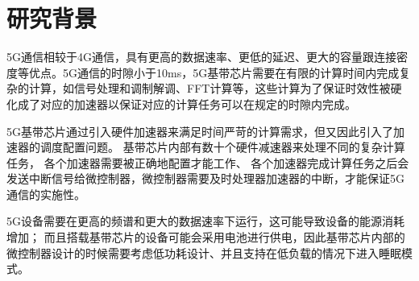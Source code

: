 \documentclass[a4paper, 12pt]{article}
\newif\ifchinese %
\begin{document}

\tableofcontents %
\newpage





\setcounter{page}{1}
\section{研究背景}%
5G通信相较于4G通信，具有更高的数据速率、更低的延迟、更大的容量跟连接密度等优点。5G通信的时隙小于10ms，5G基带芯片需要在有限的计算时间内完成复杂的计算，如信号处理和调制解调、FFT计算等，这些计算为了保证时效性被硬化成了对应的加速器以保证对应的计算任务可以在规定的时隙内完成。

5G基带芯片通过引入硬件加速器来满足时间严苛的计算需求，但又因此引入了加速器的调度配置问题。
基带芯片内部有数十个硬件减速器来处理不同的复杂计算任务，
各个加速器需要被正确地配置才能工作、
各个加速器完成计算任务之后会发送中断信号给微控制器，微控制器需要及时处理器加速器的中断，才能保证5G通信的实施性。

5G设备需要在更高的频谱和更大的数据速率下运行，这可能导致设备的能源消耗增加；
而且搭载基带芯片的设备可能会采用电池进行供电，因此基带芯片内部的微控制器设计的时候需要考虑低功耗设计、并且支持在低负载的情况下进入睡眠模式。
\end{document}
